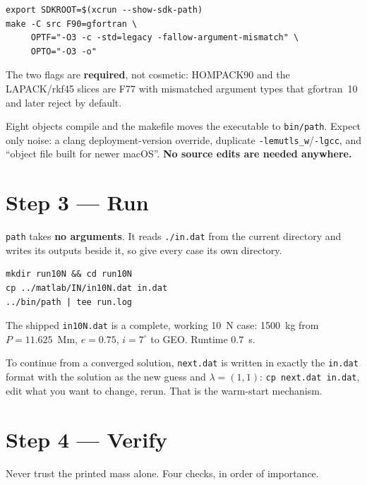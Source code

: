 \documentclass[11pt]{article}
\newcommand{\code}[1]{\texttt{\small #1}}
\newcommand{\file}[1]{\texttt{\small #1}}
\begin{document}
\begin{lstlisting}
export SDKROOT=$(xcrun --show-sdk-path)
make -C src F90=gfortran \
     OPTF="-O3 -c -std=legacy -fallow-argument-mismatch" \
     OPTO="-O3 -o"
\end{lstlisting}

\noindent
The two flags are \textbf{required}, not cosmetic: HOMPACK90 and the
LAPACK/rkf45 slices are F77 with mismatched argument types that gfortran~10
and later reject by default.

Eight objects compile and the makefile moves the executable to
\file{bin/path}. Expect only noise: a clang deployment-version override,
duplicate \code{-lemutls\_w}/\code{-lgcc}, and ``object file built for newer
macOS''. \textbf{No source edits are needed anywhere.}

\section{Step 3 --- Run}\label{sec:run}

\code{path} takes \textbf{no arguments}. It reads \file{./in.dat} from the
current directory and writes its outputs beside it, so give every case its own
directory.

\begin{lstlisting}
mkdir run10N && cd run10N
cp ../matlab/IN/in10N.dat in.dat
../bin/path | tee run.log
\end{lstlisting}

\noindent
The shipped \file{in10N.dat} is a complete, working 10~N case: 1500~kg from
$P = 11.625$~Mm, $e = 0.75$, $i = 7^\circ$ to GEO. Runtime $0.7$~s.

To continue from a converged solution, \file{next.dat} is written in exactly
the \file{in.dat} format with the solution as the new guess and
$\lambda = (1,1)$: \code{cp next.dat in.dat}, edit what you want to change,
rerun. That is the warm-start mechanism.

\section{Step 4 --- Verify}\label{sec:verify}

Never trust the printed mass alone. Four checks, in order of importance.
\end{document}
